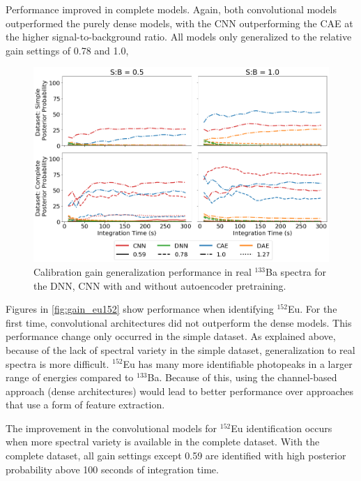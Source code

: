 Performance improved in complete models. Again, both convolutional models outperformed the purely dense models, with the CNN outperforming the CAE at the higher signal-to-background ratio. All models only generalized to the relative gain settings of 0.78 and 1.0,  


\begin{figure}[H]
	\centering
	\includegraphics[width=1.0\linewidth]{images/realspectra-cal-ba133}
	\caption{Calibration gain generalization performance in real $^{133}$Ba spectra for the DNN, CNN with and without autoencoder pretraining.}
	\label{fig:realspectra-cal-ba133}
\end{figure}


Figures in \ref{fig:gain_eu152} show performance when identifying $^{152}$Eu. For the first time, convolutional architectures did not outperform the dense models. This performance change only occurred in the simple dataset. As explained above, because of the lack of spectral variety in the simple dataset, generalization to real spectra is more difficult. $^{152}$Eu has many more identifiable photopeaks in a larger range of energies compared to $^{133}$Ba. Because of this, using the channel-based approach (dense architectures) would lead to better performance over approaches that use a form of feature extraction.

The improvement in the convolutional models for $^{152}$Eu identification occurs when more spectral variety is available in the complete dataset. With the complete dataset, all gain settings except 0.59 are identified with high posterior probability above 100 seconds of integration time. 


